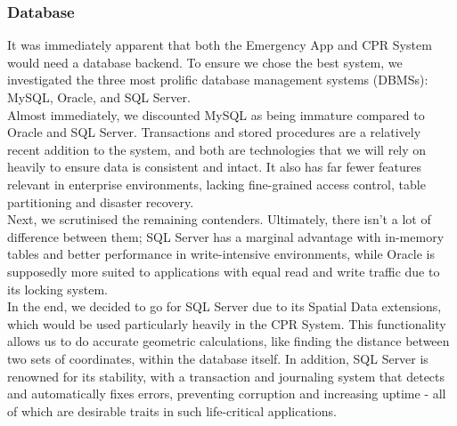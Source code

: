\documentclass{article}
\begin{document}
\pagebreak
	\subsubsection{Database}
	It was immediately apparent that both the Emergency App and CPR System would need a database backend. To ensure we chose the best system, we investigated the three most prolific database management systems (DBMSs): MySQL, Oracle, and SQL Server.\\

Almost immediately, we discounted MySQL as being immature compared to Oracle and SQL Server. Transactions and stored procedures are a relatively recent addition to the system, and both are technologies that we will rely on heavily to ensure data is consistent and intact. It also has far fewer features relevant in enterprise environments, lacking fine-grained access control, table partitioning and disaster recovery.\\

Next, we scrutinised the remaining contenders. Ultimately, there isn’t a lot of difference between them; SQL Server has a marginal advantage with in-memory tables and better performance in write-intensive environments, while Oracle is supposedly more suited to applications with equal read and write traffic due to its locking system.\\

In the end, we decided to go for SQL Server due to its Spatial Data extensions, which would be used particularly heavily in the CPR System. This functionality allows us to do accurate geometric calculations, like finding the distance between two sets of coordinates, within the database itself. In addition, SQL Server is renowned for its stability, with a transaction and journaling system that detects and automatically fixes errors, preventing corruption and increasing uptime - all of which are desirable traits in such life-critical applications.\\
	
\end{document}

